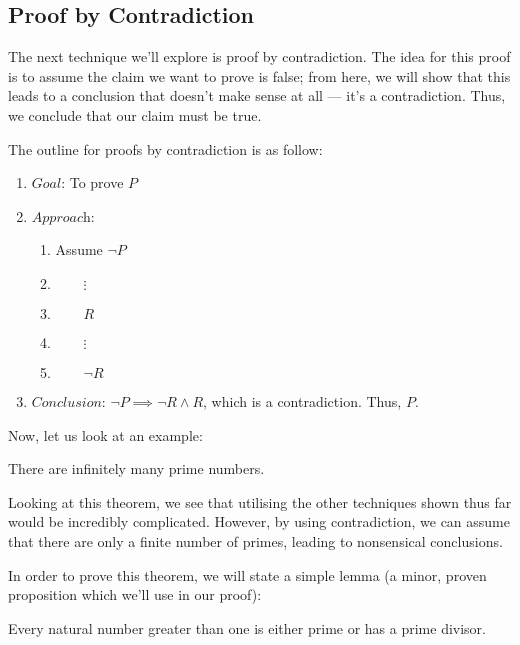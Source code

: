 \documentclass[openany]{book}
\begin{document}
\subsection{Proof by Contradiction} The next technique we'll explore is proof by contradiction. The idea for this proof is to assume the claim we want to prove is false; from here, we will show that this leads to a conclusion that doesn't make sense at all --- it's a contradiction. Thus, we conclude that our claim must be true.

The outline for proofs by contradiction is as follow:
\begin{enumerate}
	\item[] $\textit{Goal}$: To prove $P$
	\item[] $\textit{Approach}$:
	\begin{enumerate}
		\item[] Assume $\neg P$
		\item[] $\qquad\vdots$
		\item[] $\qquad R$
		\item[] $\qquad\vdots$
		\item[] $\qquad \neg R$
	\end{enumerate}
	\item[] $\textit{Conclusion}$: $\neg P \implies \neg R \land R$, which is a contradiction. Thus, $P$.
\end{enumerate}

Now, let us look at an example:
\begin{theorem}
	There are infinitely many prime numbers.
\end{theorem}

Looking at this theorem, we see that utilising the other techniques shown thus far would be incredibly complicated. However, by using contradiction, we can assume that there are only a finite number of primes, leading to nonsensical conclusions.

In order to prove this theorem, we will state a simple lemma (a minor, proven proposition which we'll use in our proof):
\begin{lemma}
	Every natural number greater than one is either prime or has a prime divisor.
\end{lemma}
\end{document}
